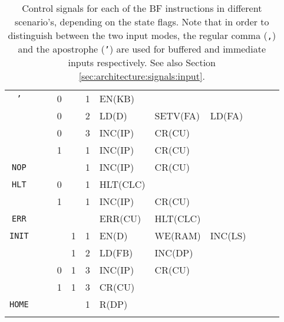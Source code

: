 \begin{longtable}[c] {c|cccc|c|llllll}
    \rowcolor{Gray}   \texttt{'}  &   &   & 0     &      & 1     & EN(KB)   &          &         &        &        &        \\
    \rowcolor{Gray}               &   &   & 0     &      & 2     & LD(D)    & SETV(FA) & LD(FA)  &        &        &        \\
    \rowcolor{Gray}               &   &   & 0     &      & 3     & INC(IP)  & CR(CU)   &         &        &        &        \\
    \rowcolor{White}              &   &   & 1     &      & 1     & INC(IP)  & CR(CU)   &         &        &        &        \\ \hline
    
    \rowcolor{Gray}  \texttt{NOP} &   &   &       &      & 1     & INC(IP)  & CR(CU)   &         &        &        &        \\ \hline
    \rowcolor{White} \texttt{HLT} &   &   & 0     &      & 1     & HLT(CLC) &          &         &        &        &        \\ 
    \rowcolor{Gray}               &   &   & 1     &      & 1     & INC(IP)  & CR(CU)   &         &        &        &        \\ \hline        
    \rowcolor{White} \texttt{ERR} &   &   &       &      &       & ERR(CU)  & HLT(CLC) &         &        &        &        \\ \hline
    \rowcolor{Gray}  \texttt{INIT}&   &   &       & 1    & 1     & EN(D)    & WE(RAM)  & INC(LS) &        &        &        \\
    \rowcolor{Gray}               &   &   &       & 1    & 2     & LD(FB)   & INC(DP)  &         &        &        &        \\
    \rowcolor{Gray}               &   &   & 0     & 1    & 3     & INC(IP)  & CR(CU)   &         &        &        &        \\
    \rowcolor{White}              &   &   & 1     & 1    & 3     & CR(CU)   &          &         &        &        &        \\ \hline
    \rowcolor{Gray} \texttt{HOME} &   &   &       &      & 1     & R(DP)    &          &         &        &        &        \\ \hline
    

    \caption{Control signals for each of the BF instructions in different scenario's, depending on the state flags. Note that in order to distinguish between the two input modes, the regular comma (\texttt{,}) and the apostrophe (\texttt{'}) are used for buffered and immediate inputs respectively. See also Section \ref{sec:architecture:signals:input}.}
    \label{tab:microcode}
  \end{longtable}
